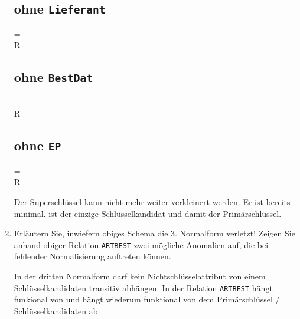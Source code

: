 \documentclass{lehramt-informatik-aufgabe}
\begin{document}
\begin{enumerate}
\begin{liAntwort}
\subsection*{ohne \texttt{Lieferant}}

\begin{liAHuelle}
 = \\
 \neq R
\end{liAHuelle}

\subsection*{ohne \texttt{BestDat}}

\begin{liAHuelle}
 = \\
 \neq R
\end{liAHuelle}

\subsection*{ohne \texttt{EP}}

\begin{liAHuelle}
 = \\
 \neq R
\end{liAHuelle}

Der Superschlüssel  kann nicht
mehr weiter verkleinert werden. Er ist bereits minimal.  ist der einzige Schlüsselkandidat und damit
der Primärschlüssel.

\end{liAntwort}


\item Erläutern Sie, inwiefern obiges Schema die 3. Normalform verletzt!
Zeigen Sie anhand obiger Relation \texttt{ARTBEST} zwei mögliche
Anomalien auf, die bei fehlender Normalisierung auftreten können.

\begin{liAntwort}
In der dritten Normalform darf kein Nichtschlüsselattribut von einem
Schlüsselkandidaten transitiv abhängen. In der Relation \texttt{ARTBEST}
hängt  funkional von  und
 hängt wiederum funktional von dem Primärschlüssel /
Schlüsselkandidaten  ab.


\end{liAntwort}
\end{enumerate}
\end{document}
